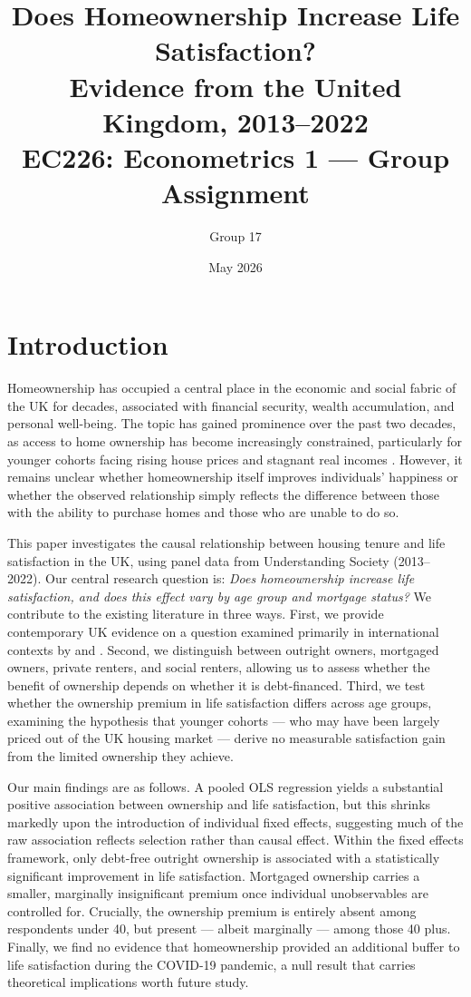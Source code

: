 \documentclass[12pt,a4paper]{article}
\title{\textbf{Does Homeownership Increase Life Satisfaction? \\
Evidence from the United Kingdom, 2013--2022} \\[1em]
\large EC226: Econometrics 1 --- Group Assignment}
\author{Group 17}
\date{May 2026}
\begin{document}
 
\maketitle
\thispagestyle{empty}
\newpage
 
\section{Introduction}
 
Homeownership has occupied a central place in the economic and social fabric of the UK for decades, associated with financial security, wealth accumulation, and personal well-being. The topic has gained prominence over the past two decades, as access to home ownership has become increasingly constrained, particularly for younger cohorts facing rising house prices and stagnant real incomes \citep{Cribb2018}. However, it remains unclear whether homeownership itself improves individuals' happiness or whether the observed relationship simply reflects the difference between those with the ability to purchase homes and those who are unable to do so.

This paper investigates the causal relationship between housing tenure and life satisfaction in the UK, using panel data from Understanding Society (2013--2022). Our central research question is: \textit{Does homeownership increase life satisfaction, and does this effect vary by age group and mortgage status?} We contribute to the existing literature in three ways. First, we provide contemporary UK evidence on a question examined primarily in international contexts by \citet{Will2024} and \citet{Cho2023}. Second, we distinguish between outright owners, mortgaged owners, private renters, and social renters, allowing us to assess whether the benefit of ownership depends on whether it is debt-financed. Third, we test whether the ownership premium in life satisfaction differs across age groups, examining the hypothesis that younger cohorts --- who may have been largely priced out of the UK housing market --- derive no measurable satisfaction gain from the limited ownership they achieve.
 
Our main findings are as follows. A pooled OLS regression yields a
substantial positive association between ownership and life satisfaction, but
this shrinks markedly upon the introduction of individual fixed effects,
suggesting much of the raw association reflects selection rather than
causal effect. Within the fixed effects framework, only debt-free outright
ownership is associated with a statistically significant improvement in life
satisfaction. Mortgaged ownership carries a smaller, marginally insignificant premium once individual unobservables are controlled for. Crucially, the ownership premium is entirely absent among respondents under 40, but present --- albeit marginally --- among those 40 plus. 
Finally, we find no evidence that homeownership provided an additional buffer to life satisfaction during the COVID-19 pandemic, a null result that carries theoretical
implications worth future study.
 
\end{document}
